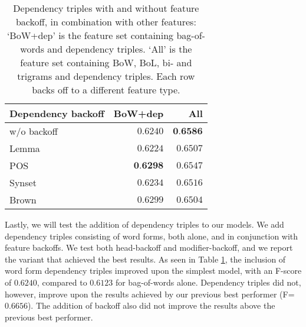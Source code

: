 \documentclass[11pt,letterpaper]{article}
\begin{document}
\begin{table}
  \begin{smaller}    
  \begin{center}
    \begin{tabular}{lrr}
      \toprule           
      Dependency backoff & BoW+dep & All\\
      \midrule
      w/o backoff & $0.6240$ & $\textbf{0.6586}$ \\
      Lemma & $0.6224$ & $0.6507$ \\
      POS & $\textbf{0.6298}$ & $0.6547$ \\ %
      Synset & $0.6234$ & $0.6516$  \\ %
      Brown & $0.6299$ & $0.6504$ \\ %
      \bottomrule
    \end{tabular}
  \end{center}
  \caption{Dependency triples with and without feature backoff, in combination with other features: 
`BoW+dep' is the feature set containing bag-of-words and dependency triples. `All' is the feature set containing BoW, BoL, bi- and trigrams and dependency triples. Each row backs off to a different feature type.}
  \label{tab:depbackoff}
  \end{smaller}
\end{table}

Lastly, we will test the addition of dependency triples to our models. We add
dependency triples consisting of word forms, both alone, and in conjunction
with feature backoffs. We test both head-backoff and modifier-backoff, and we report the variant that achieved the best results. As seen in Table
\ref{tab:depbackoff}, the inclusion of word form dependency triples improved
upon the simplest model, with an F-score of $0.6240$, compared to $0.6123$ for
bag-of-words alone. Dependency triples did not, however, improve upon the
results achieved by our previous best performer (F=$0.6656$). %
The addition of backoff also did not improve the results above the previous best performer.
\end{document}
